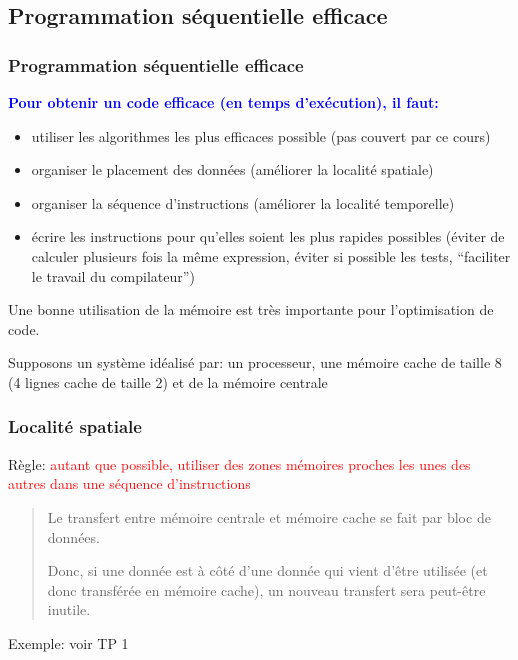 \documentclass{beamer}
\begin{document}
\begin{frame}
\section{Programmation s\'equentielle efficace}
\frametitle{Programmation s\'equentielle efficace}

\bf
\textcolor{blue}{Pour obtenir un code efficace (en temps d'ex\'ecution), il faut:}

\begin{itemize}
	\item utiliser les algorithmes les plus efficaces possible (pas couvert par ce cours)
	
	\item organiser le placement des donn\'ees (am\'eliorer la localit\'e spatiale)
	
	\item organiser la s\'equence d'instructions (am\'eliorer la localit\'e temporelle)

	\item \'ecrire les instructions pour qu'elles soient les plus rapides possibles (éviter de calculer plusieurs fois la même expression, \'eviter si possible les tests, ``faciliter le travail du compilateur'')
\end{itemize}
\end{frame}

\begin{frame}
	Une bonne utilisation de la mémoire est très importante pour l'optimisation de code.
	
	Supposons un système idéalisé par: un processeur, une mémoire cache de taille 8 (4 lignes cache de taille 2) et de la mémoire centrale
\end{frame}

\begin{frame}
\frametitle{Localit\'e spatiale}
Règle:  \textcolor{red}{autant que possible, utiliser des zones m\'emoires proches les unes des autres dans une s\'equence d'instructions}
\begin{quote}
	Le transfert entre m\'emoire centrale et m\'emoire cache se fait par bloc de donn\'ees.
	
	Donc, si une donn\'ee est \`a c\^ot\'e d'une donn\'ee qui vient d'\^etre utilis\'ee (et donc transf\'er\'ee en m\'emoire cache), un nouveau transfert sera peut-\^etre inutile.
\end{quote}

\vfill
Exemple: voir TP 1
\end{frame}
\end{document}
